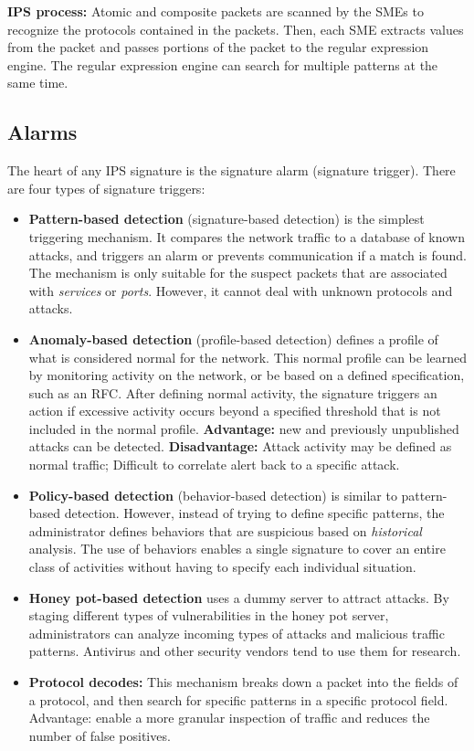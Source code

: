 \textbf{IPS process: }Atomic and composite packets are scanned by the SMEs to recognize the protocols contained in the packets. Then, each SME extracts values from the packet and passes portions of the packet to the regular expression engine. The regular expression engine can search for multiple patterns at the same time. 

\subsection{Alarms}

The heart of any IPS signature is the signature alarm (signature trigger). There are four types of signature triggers:

\begin{itemize}
\item \textbf{Pattern-based detection} (signature-based detection) is the simplest triggering mechanism. It compares the network traffic to a database of known attacks, and triggers an alarm or prevents communication if a match is found. The mechanism is only suitable for the suspect packets that are associated with \emph{services} or \emph{ports}. However, it cannot deal with unknown protocols and attacks.

\item \textbf{Anomaly-based detection} (profile-based detection) defines a profile of what is considered normal for the network. This normal profile can be learned by monitoring activity on the network, or be based on a defined specification, such as an RFC. After defining normal activity, the signature triggers an action if excessive activity occurs beyond a specified threshold that is not included in the normal profile. \textbf{Advantage:} new and previously unpublished attacks can be detected. \textbf{Disadvantage:} Attack activity may be defined as normal traffic; Difficult to correlate alert back to a specific attack.

\item \textbf{Policy-based detection} (behavior-based detection) is similar to pattern-based detection. However, instead of trying to define specific patterns, the administrator defines behaviors that are suspicious based on \emph{historical} analysis. The use of behaviors enables a single signature to cover an entire class of activities without having to specify each individual situation.

\item \textbf{Honey pot-based detection} uses a dummy server to attract attacks. By staging different types of vulnerabilities in the honey pot server, administrators can analyze incoming types of attacks and malicious traffic patterns. Antivirus and other security vendors tend to use them for research.

\item \textbf{Protocol decodes:} This mechanism breaks down a packet into the fields of a protocol, and then search for specific patterns in a specific protocol field. Advantage: enable a more granular inspection of traffic and reduces the number of false positives.
\end{itemize}

